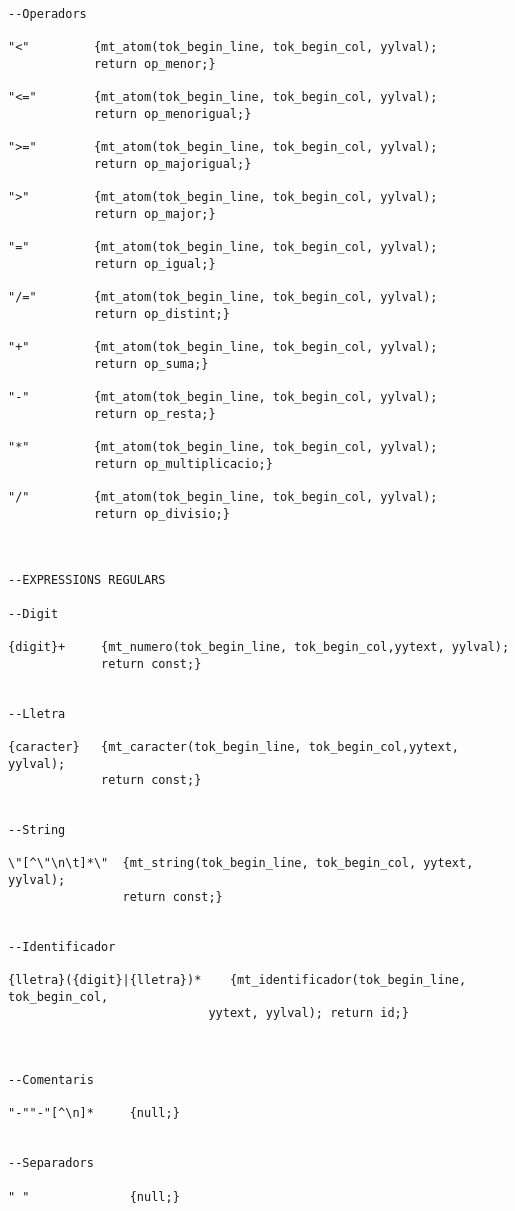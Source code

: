\documentclass[10pt]{report}
\begin{document}
\begin{lstlisting}
--Operadors

"<"         {mt_atom(tok_begin_line, tok_begin_col, yylval); 
            return op_menor;}

"<="        {mt_atom(tok_begin_line, tok_begin_col, yylval);
            return op_menorigual;}

">="        {mt_atom(tok_begin_line, tok_begin_col, yylval);
            return op_majorigual;}

">"         {mt_atom(tok_begin_line, tok_begin_col, yylval); 
            return op_major;}

"="         {mt_atom(tok_begin_line, tok_begin_col, yylval); 
            return op_igual;}

"/="        {mt_atom(tok_begin_line, tok_begin_col, yylval); 
            return op_distint;}

"+"         {mt_atom(tok_begin_line, tok_begin_col, yylval); 
            return op_suma;}

"-"         {mt_atom(tok_begin_line, tok_begin_col, yylval); 
            return op_resta;}

"*"         {mt_atom(tok_begin_line, tok_begin_col, yylval);
            return op_multiplicacio;}

"/"         {mt_atom(tok_begin_line, tok_begin_col, yylval); 
            return op_divisio;}



--EXPRESSIONS REGULARS

--Digit

{digit}+     {mt_numero(tok_begin_line, tok_begin_col,yytext, yylval);
             return const;}
            
            
--Lletra

{caracter}   {mt_caracter(tok_begin_line, tok_begin_col,yytext, yylval); 
             return const;}


--String

\"[^\"\n\t]*\"  {mt_string(tok_begin_line, tok_begin_col, yytext, yylval);
                return const;}


--Identificador

{lletra}({digit}|{lletra})*    {mt_identificador(tok_begin_line, tok_begin_col,
                            yytext, yylval); return id;}



--Comentaris

"-""-"[^\n]*     {null;}


--Separadors

" "              {null;}


\end{lstlisting}
\end{document}
